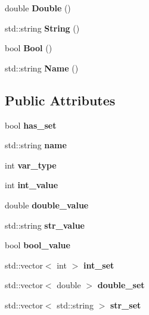 \begin{DoxyCompactItemize}
double {\bfseries Double} ()
\item 
\mbox{\label{structostendo_1_1Var_a0121e8cbc76819c9aec406a0352654ed}} 
std\+::string {\bfseries String} ()
\item 
\mbox{\label{structostendo_1_1Var_a0a7a7fb0f19d34d6e2b5da7eff8ed331}} 
bool {\bfseries Bool} ()
\item 
\mbox{\label{structostendo_1_1Var_a27b5e7f947ca4e37a827d8a4b6614a04}} 
std\+::string {\bfseries Name} ()
\end{DoxyCompactItemize}
\subsection*{Public Attributes}
\begin{DoxyCompactItemize}
\item 
\mbox{\label{structostendo_1_1Var_a2ad63d508b2a224a9cc14479e5b1047a}} 
bool {\bfseries has\+\_\+set}
\item 
\mbox{\label{structostendo_1_1Var_a4cf546206d7a22a8008d7b3125a30660}} 
std\+::string {\bfseries name}
\item 
\mbox{\label{structostendo_1_1Var_a92514adaf052e5007dbe53dda9de008f}} 
int {\bfseries var\+\_\+type}
\item 
\mbox{\label{structostendo_1_1Var_ad3e0add5d4dc88469d768bfa0c743379}} 
int {\bfseries int\+\_\+value}
\item 
\mbox{\label{structostendo_1_1Var_a034ed342b05d98766cc628974ab4a0f5}} 
double {\bfseries double\+\_\+value}
\item 
\mbox{\label{structostendo_1_1Var_a8e4299f745a15349c7b665a25475bdca}} 
std\+::string {\bfseries str\+\_\+value}
\item 
\mbox{\label{structostendo_1_1Var_ad99e4f66f5e7ae44aa4bdd7f1a4e9f79}} 
bool {\bfseries bool\+\_\+value}
\item 
\mbox{\label{structostendo_1_1Var_a169462deb8fb9e599777840a58fffc0d}} 
std\+::vector$<$ int $>$ {\bfseries int\+\_\+set}
\item 
\mbox{\label{structostendo_1_1Var_a78ebcf6a3207f950286c6188cb97359c}} 
std\+::vector$<$ double $>$ {\bfseries double\+\_\+set}
\item 
\mbox{\label{structostendo_1_1Var_ad900a259793059d2c7ed2ca1767bd6b8}} 
std\+::vector$<$ std\+::string $>$ {\bfseries str\+\_\+set}
\end{DoxyCompactItemize}


